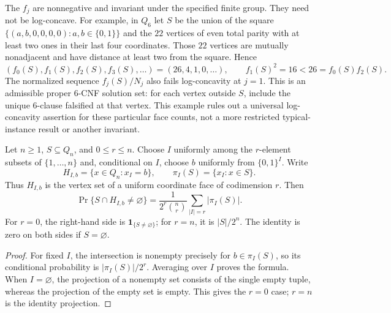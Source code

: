 \begin{remark}
The $f_j$ are nonnegative and invariant under the specified finite group.
They need not be log-concave. For example, in $Q_6$ let $S$ be the union
of the square $\{(a,b,0,0,0,0):a,b\in\{0,1\}\}$ and the $22$ vertices
of even total parity with at least two ones in their last four coordinates.
Those $22$ vertices are mutually nonadjacent and have distance at least
two from the square. Hence
\[
 (f_0(S),f_1(S),f_2(S),f_3(S),\ldots)=(26,4,1,0,\ldots),
 \qquad f_1(S)^2=16<26=f_0(S)f_2(S).
\]
The normalized sequence $f_j(S)/N_j$ also fails log-concavity at $j=1$.
This is an admissible proper $6$-CNF solution set: for each vertex outside
$S$, include the unique $6$-clause falsified at that vertex. This example
rules out a universal log-concavity assertion for these particular face
counts, not a more restricted typical-instance result or another invariant.
\end{remark}

\begin{proposition}
\label{prop:coordinate-crofton}
Let $n\ge1$, $S\subseteq Q_n$, and $0\le r\le n$. Choose $I$ uniformly
among the $r$-element subsets of $\{1,\ldots,n\}$ and, conditional on $I$,
choose $b$ uniformly from $\{0,1\}^I$. Write
\[
 H_{I,b}=\{x\in Q_n:x_I=b\},
 \qquad \pi_I(S)=\{x_I:x\in S\}.
\]
Thus $H_{I,b}$ is the vertex set of a uniform coordinate face of
codimension $r$. Then
\begin{equation}
 \Pr\{S\cap H_{I,b}\ne\varnothing\}
 =\frac{1}{2^r\binom nr}\sum_{|I|=r}|\pi_I(S)|.
 \label{eq:coordinate-crofton}
\end{equation}
For $r=0$, the right-hand side is $\mathbf 1_{\{S\ne\varnothing\}}$;
for $r=n$, it is $|S|/2^n$. The identity is zero on both sides if
$S=\varnothing$.
\end{proposition}
\begin{proof}
For fixed $I$, the intersection is nonempty precisely for
$b\in\pi_I(S)$, so its conditional probability is $|\pi_I(S)|/2^r$.
Averaging over $I$ proves the formula. When $I=\varnothing$, the
projection of a nonempty set consists of the single empty tuple,
whereas the projection of the empty set is empty. This gives the
$r=0$ case; $r=n$ is the identity projection.
\end{proof}

